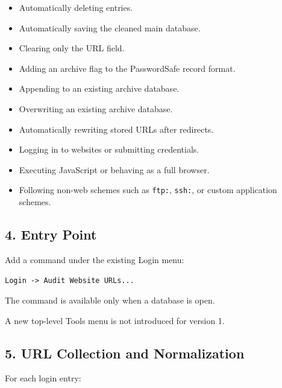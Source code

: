 \documentclass[
  letterpaper,
]{article}
\newcommand{\passthrough}[1]{#1}
\providecommand{\tightlist}{%
  \setlength{\itemsep}{0pt}\setlength{\parskip}{0pt}}
\begin{document}
\begin{itemize}
\tightlist
\item
  Automatically deleting entries.
\item
  Automatically saving the cleaned main database.
\item
  Clearing only the URL field.
\item
  Adding an archive flag to the PasswordSafe record format.
\item
  Appending to an existing archive database.
\item
  Overwriting an existing archive database.
\item
  Automatically rewriting stored URLs after redirects.
\item
  Logging in to websites or submitting credentials.
\item
  Executing JavaScript or behaving as a full browser.
\item
  Following non-web schemes such as \passthrough{\lstinline!ftp:!}, \passthrough{\lstinline!ssh:!}, or custom
  application schemes.
\end{itemize}

\subsection{4. Entry Point}\label{4-entry-point}

Add a command under the existing Login menu:

\passthrough{\lstinline!Login -> Audit Website URLs...!}

The command is available only when a database is open.

A new top-level Tools menu is not introduced for version 1.

\subsection{5. URL Collection and Normalization}\label{5-url-collection-and-normalization}

For each login entry:
\end{document}
